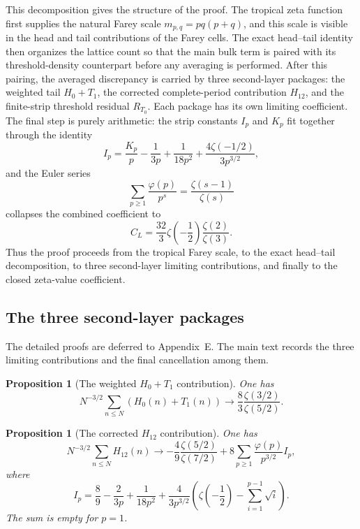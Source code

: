 \documentclass[a4paper,american,11pt]{amsart}
\theoremstyle{plain}
\newtheorem{proposition}[theorem]{Proposition}
\theoremstyle{definition}
\begin{document}
This decomposition gives the structure of the proof. The tropical zeta
function first supplies the natural Farey scale \(m_{p,q}=pq(p+q)\), and
this scale is visible in the head and tail contributions of the Farey cells.
The exact head--tail identity then organizes the lattice count so that the
main bulk term is paired with its threshold-density counterpart before any
averaging is performed. After this pairing, the averaged discrepancy is
carried by three second-layer packages: the weighted tail \(H_0+T_1\), the
corrected complete-period contribution \(H_{12}\), and the finite-strip
threshold residual \(R_{T_0}\). Each package has its own limiting
coefficient. The final step is purely arithmetic: the strip constants
\(I_p\) and \(K_p\) fit together through the identity
\[
I_p=\frac{K_p}{p}-\frac{1}{3p}+\frac{1}{18p^2}
+\frac{4\zeta(-1/2)}{3p^{3/2}},
\]
and the Euler series
\[
\sum_{p\ge1}\frac{\varphi(p)}{p^s}
=
\frac{\zeta(s-1)}{\zeta(s)}
\]
collapses the combined coefficient to
\[
C_L=
\frac{32}{3}\zeta\!\left(-\frac12\right)
\frac{\zeta(2)}{\zeta(3)}.
\]
Thus the proof proceeds from the tropical Farey scale, to the exact
head--tail decomposition, to three second-layer limiting contributions, and
finally to the closed zeta-value coefficient.

\subsection{The three second-layer packages}

The detailed proofs are deferred to Appendix~E. The main text records the
three limiting contributions and the final cancellation among them.

\begin{proposition}[The weighted \(H_0+T_1\) contribution]\label{prop:H0T1}
One has
\begin{equation}\label{eq:H0T1limit}
N^{-3/2}\sum_{n\le N}(H_0(n)+T_1(n))
\longrightarrow
\frac83\frac{\zeta(3/2)}{\zeta(5/2)}.
\end{equation}
\end{proposition}

\begin{proposition}[The corrected \(H_{12}\) contribution]\label{prop:H12corr}
One has
\begin{equation}\label{eq:H12limit}
N^{-3/2}\sum_{n\le N}H_{12}(n)
\longrightarrow
-\frac49\frac{\zeta(5/2)}{\zeta(7/2)}
+8\sum_{p\ge1}\frac{\varphi(p)}{p^{3/2}}I_p,
\end{equation}
where
\begin{equation}\label{eq:Ipdef}
I_p
=
\frac89-\frac{2}{3p}+\frac{1}{18p^2}
+\frac{4}{3p^{3/2}}
\left(
\zeta\!\left(-\frac12\right)-\sum_{i=1}^{p-1}\sqrt i
\right).
\end{equation}
The sum is empty for \(p=1\).
\end{proposition}
\end{document}
